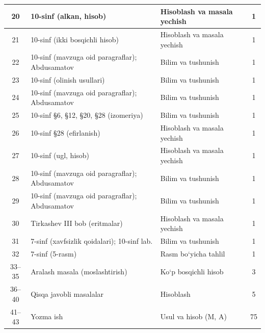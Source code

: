 \documentclass[11pt,a4paper]{article}
\begin{document}
{\begin{longtable}{|c|p{7.2cm}|p{5.4cm}|c|}
20 & 10-sinf (alkan, hisob) & Hisoblash va masala yechish & 1\\\hline
21 & 10-sinf (ikki bosqichli hisob) & Hisoblash va masala yechish & 1\\\hline
22 & 10-sinf (mavzuga oid paragraflar); Abdusamatov & Bilim va tushunish & 1\\\hline
23 & 10-sinf (olinish usullari) & Bilim va tushunish & 1\\\hline
24 & 10-sinf (mavzuga oid paragraflar); Abdusamatov & Bilim va tushunish & 1\\\hline
25 & 10-sinf \S{}6, \S{}12, \S{}20, \S{}28 (izomeriya) & Bilim va tushunish & 1\\\hline
26 & 10-sinf \S{}28 (efirlanish) & Hisoblash va masala yechish & 1\\\hline
27 & 10-sinf (ugl, hisob) & Hisoblash va masala yechish & 1\\\hline
28 & 10-sinf (mavzuga oid paragraflar); Abdusamatov & Bilim va tushunish & 1\\\hline
29 & 10-sinf (mavzuga oid paragraflar); Abdusamatov & Bilim va tushunish & 1\\\hline
30 & Tirkashev III bob (eritmalar) & Hisoblash va masala yechish & 1\\\hline
31 & 7-sinf (xavfsizlik qoidalari); 10-sinf lab. & Bilim va tushunish & 1\\\hline
32 & 7-sinf (5-rasm) & Rasm bo`yicha tahlil & 1\\\hline
33--35 & Aralash masala (moslashtirish) & Ko`p bosqichli hisob & 3\\\hline
36--40 & Qisqa javobli masalalar & Hisoblash & 5\\\hline
41--43 & Yozma ish & Usul va hisob (M, A) & 75\\\hline
\end{longtable}}
\end{document}
